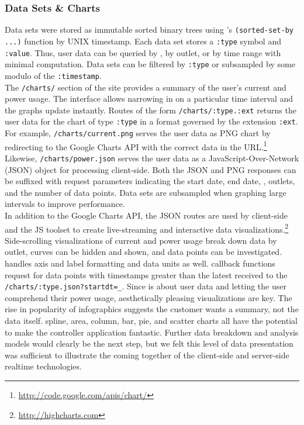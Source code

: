 \subsubsection{Data Sets \& Charts}
Data sets were stored as immutable sorted binary trees using \clojure's \texttt{(sorted-set-by ...)} function by UNIX timestamp.  Each data set stores a \texttt{:type} symbol and  \texttt{:value}.  Thus, user data can be queried by \netlet, by outlet, or by time range with minimal computation.  Data sets can be filtered by \texttt{:type} or subsampled by some modulo of the \texttt{:timestamp}.\\

The \texttt{/charts/} section of the site provides a summary of the user's current and power usage.  The interface allows narrowing in on a particular time interval and the graphs update instantly.  Routes of the form \texttt{/charts/:type.:ext} returns the user data for the chart of type \texttt{:type} in a format governed by the extension \texttt{:ext}.  For example, \texttt{/charts/current.png} serves the user data as PNG chart by redirecting to the Google Charts API with the correct data in the URL.\footnote{\url{http://code.google.com/apis/chart/}}  Likewise, \texttt{/charts/power.json} serves the user data as a JavaScript-Over-Network (JSON) object for processing client-side.  Both the JSON and PNG responses can be suffixed with request parameters indicating the start date, end date, \netlets, outlets, and the number of data points.  Data sets are subsampled when graphing large intervals to improve performance.\\

In addition to the Google Charts API, the JSON routes are used by client-side \js and the \highcharts JS toolset to create live-streaming and interactive data visualizations.\footnote{\url{http://highcharts.com}}  Side-scrolling visualizations of current and power usage break down data by outlet, curves can be hidden and shown, and data points can be investigated.  \highcharts handles axis and label formatting and data units as well. \js callback functions request for data points with timestamps greater than the latest received to the \texttt{/charts/:type.json?startdt=\_}.  Since \netlets is about user data and letting the user comprehend their power usage, aesthetically pleasing visualizations are key. The rise in popularity of infographics suggests the customer wants a summary, not the data itself. \highcharts spline, area, column, bar, pie, and scatter charts all have the potential to make the \netlets controller application fantastic.  Further data breakdown and analysis models would clearly be the next step, but we felt this level of data presentation was sufficient to illustrate the coming together of the client-side and server-side realtime technologies.\\



